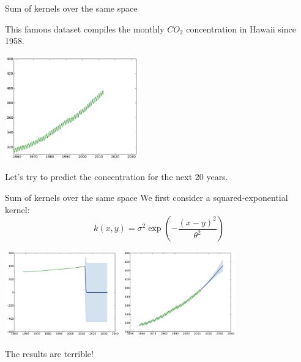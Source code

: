 \documentclass{beamer}
\begin{document}
\begin{frame}{Sum of kernels over the same space }
\begin{example}
This famous dataset compiles the monthly $CO_2$ concentration in Hawaii since 1958.
\begin{center}
\includegraphics[height=4.5cm]{figures/python/CO2-data}
\end{center}
Let's try to predict the concentration for the next 20 years.
\end{example}
\end{frame}

\begin{frame}{Sum of kernels over the same space }
We first consider a squared-exponential kernel: 
$$ \displaystyle k(x,y) = \sigma^2\exp \left(-\frac{(x-y)^2}{\theta^2} \right)$$
\begin{center}
\includegraphics[height=3.7cm]{figures/python/CO2-rbfa} \quad \includegraphics[height=3.7cm]{figures/python/CO2-rbfb}
\end{center}
\begin{block}{}
\centering
\alert{The results are terrible!}
\end{block}
\end{frame}
\end{document}
